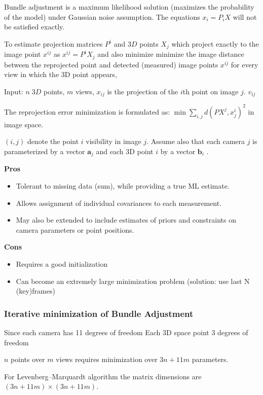 Bundle adjustment is a maximum likelihood solution (maximizes the probability of the model) under Gaussian noise assumption. The equations $x_i = P_i X$ will not be satisfied exactly.

To estimate projection matrices $P^i$ and $3D$ points $X_j$ which project exactly to the image point $x^{ij}$ as $x^{ij} = P^i X_j$ and also minimize minimize the image distance between the reprojected point and detected (measured) image points $x^{ij}$ for every view in which the 3D point appears,

Input: $n \; 3D$ points, $m$ views, $x_{ij}$ is the projection of the $i$th point on image $j$. $v_{ij}$

The reprojection error minimization is formulated as: $\min \sum_{i,j} d(P X^j, x_j^i)^2 $ in image space.

$(i,j)$ denote the point $i$ visibility in image $j$. Assume also that each camera $j$  is parameterized by a vector $\mathbf{a}_{j}$ and each 3D point $i$ by a vector $\mathbf{b}_{i}$ . 


\textbf{Pros} 
\begin{itemize}
\item Tolerant to missing data (sum), while providing a true ML estimate.
\item Allows assignment of individual covariances to each measurement.
\item May also be extended to include estimates of priors and constraints on camera parameters or point positions.
\end{itemize}

\textbf{Cons}
\begin{itemize}
\item Requires a good initialization 
\item Can become an extremely large minimization problem (solution: use last N (key)frames)
\end{itemize}


\subsubsection{Iterative minimization of Bundle Adjustment}

Since each camera has 11 degrees of freedom 
Each 3D space point 3 degrees of freedom

$n$ points over $m$ views requires minimization over $3n + 11m$ parameters. 

For Levenberg–Marquardt algorithm the matrix dimensions are $(3n + 11m)\times (3n + 11m)$.

